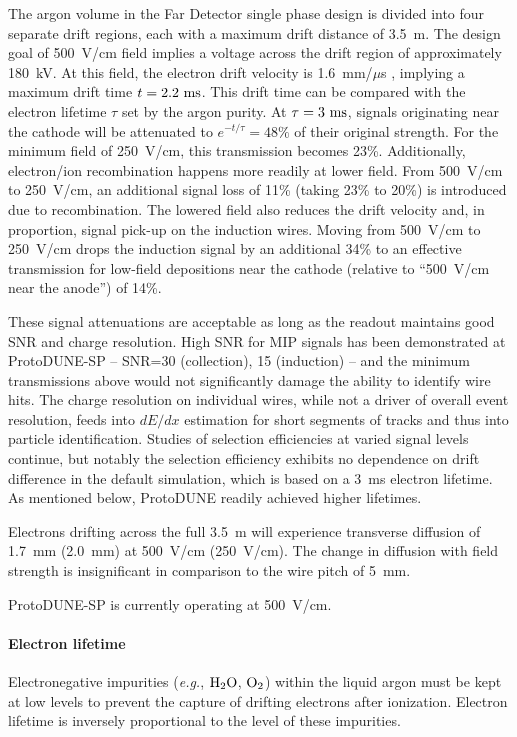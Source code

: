 The argon volume in the Far Detector single phase design is 
divided into four separate drift regions, each with a maximum 
drift distance of 3.5~m.  The design goal of 500~V/cm field 
implies a voltage across the drift region of approximately 
180~kV.  At this field, the electron drift velocity is 
1.6~mm/$\mu$s , implying a maximum drift time $t=2.2~\rm{ms}$.  
This drift time can be compared with the electron lifetime 
$\tau$ set by the argon purity.  At $\tau=3~\rm{ms}$, signals
originating near the cathode will be attenuated to 
$e^{-t/\tau} = 48\%$ of their original strength.  
For the minimum field of 250~V/cm, this transmission becomes 
23\%.  Additionally, electron/ion recombination happens more 
readily at lower field.  From 500~V/cm to 250~V/cm, 
an additional signal loss of 11\% (taking 23\% to 20\%) is 
introduced due to recombination.  The lowered field also 
reduces the drift velocity and, in proportion, signal pick-up 
on the induction wires.  Moving from 500~V/cm to 250~V/cm drops 
the induction signal by an additional 34\% to an effective
transmission for low-field depositions near the cathode 
(relative to ``500~V/cm near the anode'') of 14\%.

These signal attenuations are acceptable as long as the readout 
maintains good SNR and charge resolution.  High SNR for 
MIP signals has been demonstrated at ProtoDUNE-SP -- SNR=30 
(collection), 15 (induction) -- and the minimum transmissions 
above would not significantly damage the ability to identify 
wire hits.  The charge resolution on individual wires, while not 
a driver of overall event resolution, feeds into $dE/dx$ 
estimation for short segments of tracks and thus into 
particle identification.  Studies of selection efficiencies at 
varied signal levels continue, but notably the \nue 
selection efficiency exhibits no dependence on drift 
difference in the default simulation, which is based on a 
3~ms electron lifetime.  As mentioned below, ProtoDUNE readily 
achieved higher lifetimes.

Electrons drifting across the full 3.5~m will experience 
transverse diffusion of 1.7~mm (2.0~mm) at 500~V/cm (250~V/cm).  
The change in diffusion with field strength is insignificant in comparison to the wire pitch of 5~mm.

ProtoDUNE-SP is currently operating at 500~V/cm.

\paragraph{Electron lifetime}
Electronegative impurities ({\em e.g.}, $\rm{H}_{2}\rm{O}$, $\rm{O}_{2}$) within the liquid argon must be kept at 
low levels to prevent the capture of drifting electrons after ionization.  Electron lifetime is inversely proportional to the level of these impurities.

